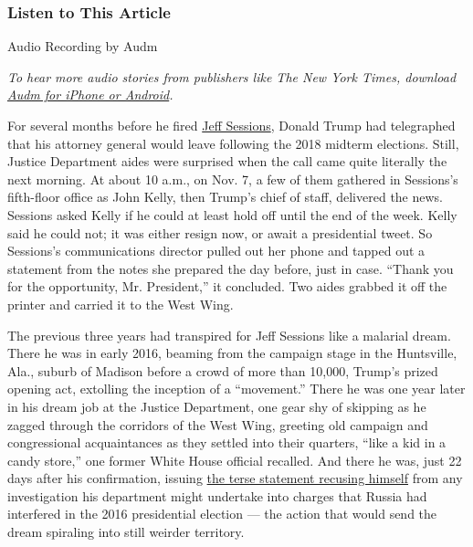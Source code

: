 \hypertarget{listen-to-this-article}{%
\subsubsection{Listen to This Article}\label{listen-to-this-article}}

Audio Recording by Audm

\emph{To hear more audio stories from publishers like The New York
Times, download}
\emph{\href{https://www.audm.com/?utm_source=nytmag\&utm_medium=embed\&utm_campaign=outcast_jeff_sessions}{Audm
for iPhone or Android}.}

For several months before he fired
\href{https://www.nytimes3xbfgragh.onion/2020/07/14/us/politics/Election-primary-runoff-results.html}{Jeff
Sessions}, Donald Trump had telegraphed that his attorney general would
leave following the 2018 midterm elections. Still, Justice Department
aides were surprised when the call came quite literally the next
morning. At about 10 a.m., on Nov. 7, a few of them gathered in
Sessions's fifth-floor office as John Kelly, then Trump's chief of
staff, delivered the news. Sessions asked Kelly if he could at least
hold off until the end of the week. Kelly said he could not; it was
either resign now, or await a presidential tweet. So Sessions's
communications director pulled out her phone and tapped out a statement
from the notes she prepared the day before, just in case. ``Thank you
for the opportunity, Mr. President,'' it concluded. Two aides grabbed it
off the printer and carried it to the West Wing.

The previous three years had transpired for Jeff Sessions like a
malarial dream. There he was in early 2016, beaming from the campaign
stage in the Huntsville, Ala., suburb of Madison before a crowd of more
than 10,000, Trump's prized opening act, extolling the inception of a
``movement.'' There he was one year later in his dream job at the
Justice Department, one gear shy of skipping as he zagged through the
corridors of the West Wing, greeting old campaign and congressional
acquaintances as they settled into their quarters, ``like a kid in a
candy store,'' one former White House official recalled. And there he
was, just 22 days after his confirmation, issuing
\href{https://www.nytimes3xbfgragh.onion/2017/03/02/us/politics/jeff-sessions-russia-trump-investigation-democrats.html}{the
terse statement recusing himself} from any investigation his department
might undertake into charges that Russia had interfered in the 2016
presidential election --- the action that would send the dream spiraling
into still weirder territory.

